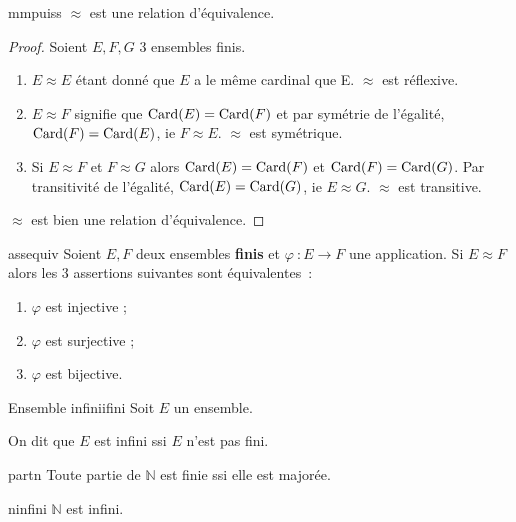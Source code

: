 \documentclass[a4paper,french,final]{memoir}
\begin{document}
\begin{theoremb}{}{mmpuiss}
    $ \mathrel{\approx}$ est une relation d'équivalence. 
\end{theoremb}

\begin{proof}
    Soient $E, F, G$ 3 ensembles finis.
	\begin{enumerate} 
		\item $E \mathrel{\approx} E$ étant donné que $E$ a le même cardinal que E. $\mathrel{\approx}$ est réflexive.
		\item $E \mathrel{\approx} F$ signifie que $ \operatorname{Card}(E) = \operatorname{Card}(F)$ et par symétrie de l'égalité, $\operatorname{Card}(F) = \operatorname{Card}(E)$, ie $F \mathrel{\approx} E$. $\mathrel{\approx}$ est symétrique. 
		\item Si $E \mathrel{\approx} F$ et $F \mathrel{\approx} G$ alors $\operatorname{Card}(E) = \operatorname{Card}(F)$ et $\operatorname{Card}(F) = \operatorname{Card}(G)$. Par transitivité de l'égalité, $\operatorname{Card}(E) = \operatorname{Card}(G)$, ie $E \mathrel{\approx} G$. $\mathrel{\approx}$ est transitive. 
	\end{enumerate}
	$\mathrel{\approx}$ est bien une relation d'équivalence.
\end{proof}

\begin{theoremb}{}{assequiv}
	Soient $E, F$ deux ensembles \textbf{finis} et $\varphi~: E \to F$ une application. Si $E \mathrel{\approx} F$ alors les 3 assertions suivantes sont équivalentes~:
	
	\begin{enumerate}
		\item $\varphi$ est injective ;
		\item $\varphi$ est surjective ;
		\item $\varphi$ est bijective. 
	\end{enumerate}
\end{theoremb}

\begin{defb}{Ensemble infini}{ifini}
	Soit $E$ un ensemble.
	
	On dit que $E$ est infini ssi $E$ n'est pas fini.
\end{defb}

\begin{theoremb}{}{partn} 
	Toute partie de $\mathbb{N}$ est finie ssi elle est majorée. 
\end{theoremb}



\begin{theoremb}{}{ninfini}
	$\mathbb{N}$ est infini. 
\end{theoremb}
\end{document}
